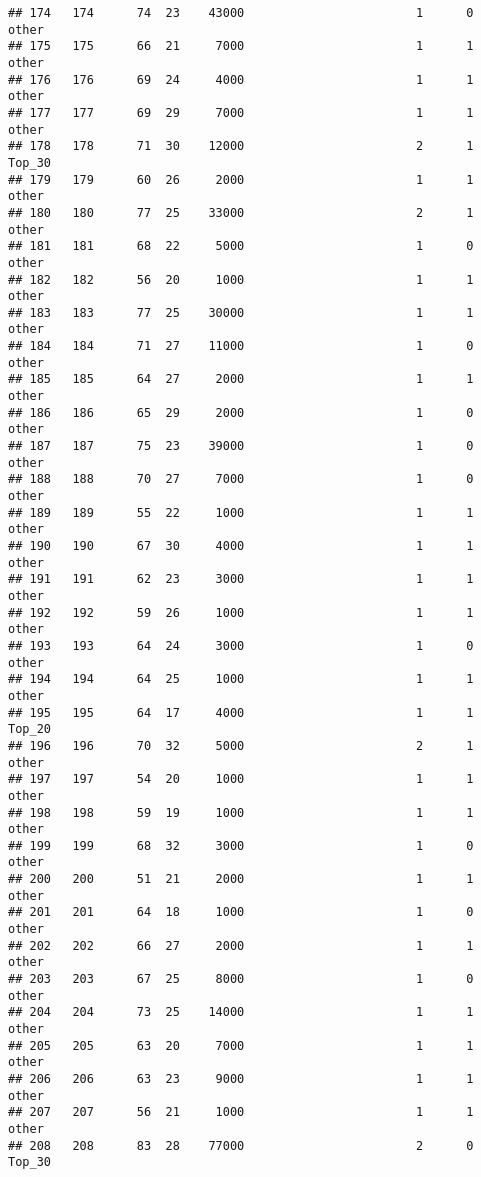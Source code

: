 \documentclass[
]{article}
\begin{document}
\begin{verbatim}
## 174   174      74  23    43000                        1      0    other
## 175   175      66  21     7000                        1      1    other
## 176   176      69  24     4000                        1      1    other
## 177   177      69  29     7000                        1      1    other
## 178   178      71  30    12000                        2      1   Top_30
## 179   179      60  26     2000                        1      1    other
## 180   180      77  25    33000                        2      1    other
## 181   181      68  22     5000                        1      0    other
## 182   182      56  20     1000                        1      1    other
## 183   183      77  25    30000                        1      1    other
## 184   184      71  27    11000                        1      0    other
## 185   185      64  27     2000                        1      1    other
## 186   186      65  29     2000                        1      0    other
## 187   187      75  23    39000                        1      0    other
## 188   188      70  27     7000                        1      0    other
## 189   189      55  22     1000                        1      1    other
## 190   190      67  30     4000                        1      1    other
## 191   191      62  23     3000                        1      1    other
## 192   192      59  26     1000                        1      1    other
## 193   193      64  24     3000                        1      0    other
## 194   194      64  25     1000                        1      1    other
## 195   195      64  17     4000                        1      1   Top_20
## 196   196      70  32     5000                        2      1    other
## 197   197      54  20     1000                        1      1    other
## 198   198      59  19     1000                        1      1    other
## 199   199      68  32     3000                        1      0    other
## 200   200      51  21     2000                        1      1    other
## 201   201      64  18     1000                        1      0    other
## 202   202      66  27     2000                        1      1    other
## 203   203      67  25     8000                        1      0    other
## 204   204      73  25    14000                        1      1    other
## 205   205      63  20     7000                        1      1    other
## 206   206      63  23     9000                        1      1    other
## 207   207      56  21     1000                        1      1    other
## 208   208      83  28    77000                        2      0   Top_30

\end{verbatim}
\end{document}
